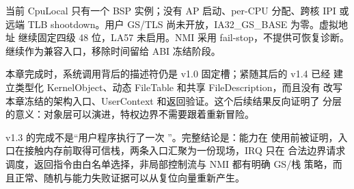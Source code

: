 当前 CpuLocal 只有一个 BSP 实例；没有 AP 启动、per-CPU 分配、跨核 IPI 或
远端 TLB shootdown。用户 GS/TLS 尚未开放，IA32\_GS\_BASE 为零。虚拟地址
继续固定四级 48 位，LA57 未启用。NMI 采用 fail-stop，不提供可恢复诊断。
 继续作为兼容入口，移除时间留给 ABI 冻结阶段。

本章完成时，系统调用背后的描述符仍是 v1.0 固定槽；紧随其后的 v1.4 已经
建立类型化 KernelObject、动态 FileTable 和共享 FileDescription，而且没有
改写本章冻结的架构入口、UserContext 和返回验证。这个后续结果反向证明了
分层的意义：对象层可以演进，特权边界不需要跟着重新冒险。

\begin{keyidea}
v1.3 的完成不是“用户程序执行了一次 ”。完整结论是：能力在
使用前被证明，入口在接触内存前取得可信栈，两条入口汇聚为一份现场，IRQ 只在
合法边界请求调度，返回指令由白名单选择，非局部控制流与 NMI 都有明确 GS/栈
策略，而且正常、随机与能力失败证据可以从复位向量重新产生。
\end{keyidea}
